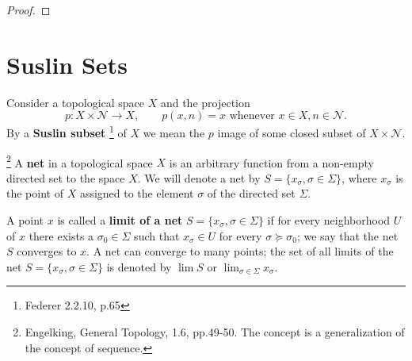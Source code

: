 \begin{proof}
% 
% 

\end{proof}

\section{Suslin Sets}

\begin{definition} \label{D:suslin_set}
Consider a topological space $X$ and the projection
\[
	p: X\times \mathcal{N} \to X, \qquad 
	\text{$p(x,n) = x$ whenever $x\in X, n\in\mathcal{N}$}.
\]
By a \textbf{Suslin subset}
\footnote{Federer 2.2.10, p.65}
of $X$ we mean the $p$ image of some closed subset of $X\times \mathcal{N}$.
\end{definition}

\begin{definition}
\footnote{Engelking, General Topology, 1.6, pp.49-50. The concept is a
  generalization of the concept of sequence.}
A \textbf{net} 
in a topological space $X$ is an arbitrary function from a non-empty directed
set to the space $X$. We will denote a net by 
$S=\{x_{\sigma}, \sigma\in\Sigma\}$, where $x_{\sigma}$ is the point of $X$
assigned to the element $\sigma$ of the directed set $\Sigma$.

A point $x$ is called a \textbf{limit of a net}
$S=\{x_{\sigma}, \sigma\in\Sigma\}$ if for every neighborhood $U$ of $x$ there
exists a $\sigma_0\in\Sigma$ such that $x_{\sigma}\in U$ for every 
$\sigma\succeq\sigma_0$; we say that the net $S$ converges to $x$. A net can
converge to many points; the set of all limits of the net
$S=\{x_{\sigma}, \sigma\in\Sigma\}$ is denoted by $\lim S$ or
$\lim_{\sigma\in\Sigma} x_{\sigma}$. 
\end{definition}

